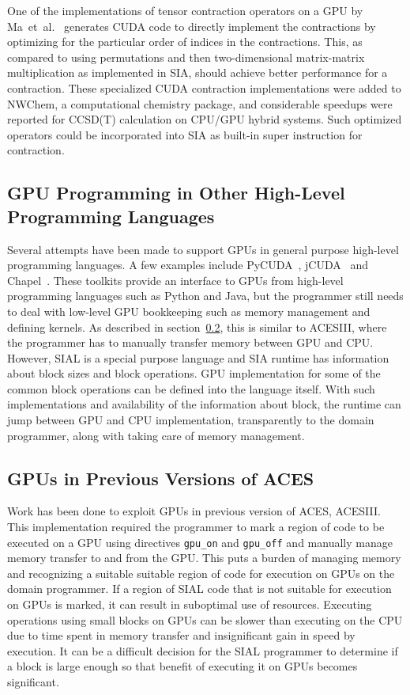 One of the implementations of tensor contraction operators on a GPU by
Ma~et~al.~\cite{Ma2013} generates CUDA code to directly implement the contractions
by optimizing for the particular order of indices in the contractions. This, as
compared to using permutations and then two-dimensional matrix-matrix multiplication
as implemented in SIA, should achieve better performance for a contraction. These
specialized CUDA contraction implementations were added to NWChem, a computational
chemistry package, and considerable speedups were reported for CCSD(T) calculation
on CPU/GPU hybrid systems. Such optimized operators could be incorporated into SIA
as built-in super instruction for contraction.

\subsection{GPU Programming in Other High-Level Programming Languages}
Several attempts have been made to support GPUs in general purpose high-level programming
languages. A few examples include PyCUDA~\cite{pycuda2011},
jCUDA~\cite{jcuda2009} and Chapel~\cite{chapelgpu}. These toolkits provide an interface
to GPUs from high-level programming languages such as Python and Java, but the
programmer still needs to deal with low-level GPU bookkeeping such as memory
management and defining kernels. As described in section~\ref{relatedworkacesiiigpu},
this is similar to ACESIII, where the programmer has to manually transfer memory
between GPU and CPU. However, SIAL is a special purpose language and SIA runtime
has information about block sizes and block operations. GPU implementation for
some of the common block operations can be defined into the language itself. With
such implementations and availability of the information about block, the runtime can jump between
GPU and CPU implementation, transparently to the domain programmer, along with taking
care of memory management.

\subsection{GPUs in Previous Versions of ACES}\label{relatedworkacesiiigpu}
Work has been done to exploit GPUs in previous version of ACES, ACESIII\cite{Jindal2016}.
This implementation
required the programmer to mark a region of code to be executed on a GPU using
directives \texttt{gpu\_on} and \texttt{gpu\_off} and manually manage memory
transfer to and from the GPU. This puts a burden of managing memory and recognizing a
suitable suitable region of code for execution on GPUs on the domain programmer.
If a region of SIAL code that is not suitable for execution on GPUs is marked, it can result
in suboptimal use of resources. Executing operations using small blocks on GPUs can
be slower than executing on the CPU due to time spent in memory transfer and
insignificant gain in speed by execution. It can be a difficult decision for the
SIAL programmer to determine if a block is large enough so that benefit of executing
it on GPUs becomes significant.

